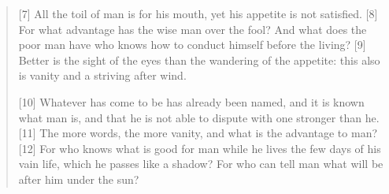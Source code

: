 \begin{quote}
    [7] All the toil of man is for his mouth, yet his appetite is not
    satisfied.  [8] For what advantage has the wise man over the fool?  And
    what does the poor man have who knows how to conduct himself before the
    living?  [9] Better is the sight of the eyes than the wandering of the
    appetite: this also is vanity and a striving after wind.

    [10] Whatever has come to be has already been named, and it is known what
    man is, and that he is not able to dispute with one stronger than he.
    [11] The more words, the more vanity, and what is the advantage to man?
    [12] For who knows what is good for man while he lives the few days of
    his vain life, which he passes like a shadow?  For who can tell man what
    will be after him under the sun?
  \end{quote}
